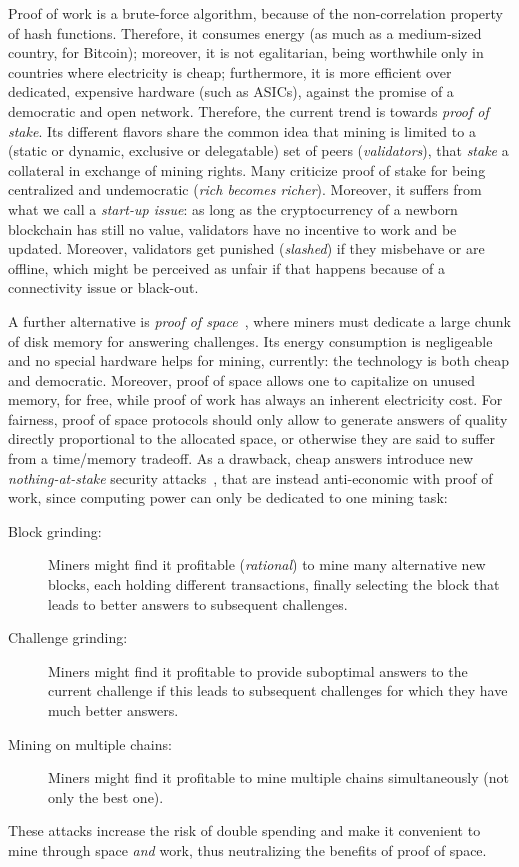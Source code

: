 Proof of work is a brute-force algorithm,
because of the non-correlation property of hash functions.
Therefore, it consumes energy (as much as a medium-sized country, for Bitcoin);
moreover, it is not egalitarian, being
worthwhile only in countries where electricity is cheap; furthermore, it
is more efficient over dedicated, expensive hardware (such as ASICs),
against the promise of a democratic and open network.
Therefore, the current trend is towards \emph{proof of stake}.
Its different flavors share the common idea that mining is limited
to a (static or dynamic, exclusive or delegatable)
set of peers (\emph{validators}), that \emph{stake} a collateral in exchange of mining rights.
Many criticize proof of stake for being centralized and undemocratic
(\emph{rich becomes richer}).
Moreover, it suffers from what we call a \emph{start-up issue}: as long as the cryptocurrency
of a newborn blockchain has still no value, validators have no incentive to work
and be updated. Moreover, validators get punished (\emph{slashed}) if they misbehave or are offline, which
might be perceived as unfair if that happens because of a connectivity issue or black-out.

A further alternative is \emph{proof of space}~\cite{AtenieseBFG14,DziembowskiFKP15}, where
miners must dedicate a large chunk of disk memory for answering challenges.
Its energy consumption is negligeable and no special
hardware helps for mining, currently: the technology is both cheap
and democratic. Moreover, proof of space allows
one to capitalize on unused memory, for free, while proof of work has always an
inherent electricity cost.
For fairness, proof of space protocols should only allow to generate answers of
quality directly proportional to the allocated space, or otherwise they are said
to suffer from a time/memory tradeoff. As a drawback,
cheap answers introduce new \emph{nothing-at-stake} security
attacks~\cite{ParkKFGAP18}, that are instead anti-economic with proof of work,
since computing power can only be dedicated to one mining task:
%
\begin{description}
\item[Block grinding:] Miners might find it profitable (\emph{rational})
  to mine many alternative new blocks, each holding
  different transactions, finally selecting the block that leads to better answers
  to subsequent challenges.
\item[Challenge grinding:] Miners might find it profitable
  to provide suboptimal answers to the current challenge if
  this leads to subsequent challenges for which they have much better answers.
\item[Mining on multiple chains:] Miners might find it profitable
  to mine multiple chains simultaneously (not only the best one).
\end{description}
%
These attacks increase the risk of double spending and make it convenient
to mine through space \emph{and} work, thus neutralizing the benefits of proof of space.

